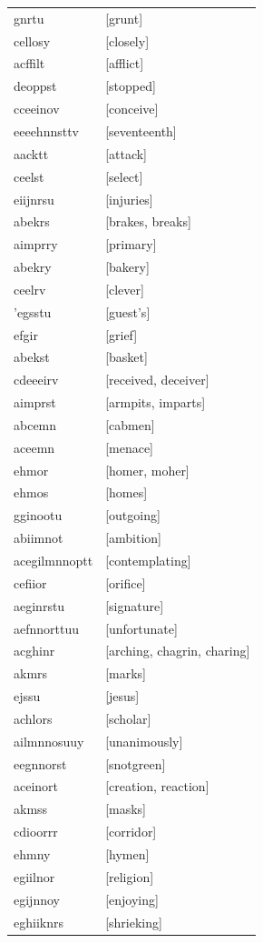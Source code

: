 \documentclass{article}
\begin{document}
\begin{tabular}{ll}
gnrtu & [grunt] \\
cellosy & [closely] \\
acffilt & [afflict] \\
deoppst & [stopped] \\
cceeinov & [conceive] \\
eeeehnnsttv & [seventeenth] \\
aacktt & [attack] \\
ceelst & [select] \\
eiijnrsu & [injuries] \\
abekrs & [brakes, breaks] \\
aimprry & [primary] \\
abekry & [bakery] \\
ceelrv & [clever] \\
'egsstu & [guest's] \\
efgir & [grief] \\
abekst & [basket] \\
cdeeeirv & [received, deceiver] \\
aimprst & [armpits, imparts] \\
abcemn & [cabmen] \\
aceemn & [menace] \\
ehmor & [homer, moher] \\
ehmos & [homes] \\
gginootu & [outgoing] \\
abiimnot & [ambition] \\
acegilmnnoptt & [contemplating] \\
cefiior & [orifice] \\
aeginrstu & [signature] \\
aefnnorttuu & [unfortunate] \\
acghinr & [arching, chagrin, charing] \\
akmrs & [marks] \\
ejssu & [jesus] \\
achlors & [scholar] \\
ailmnnosuuy & [unanimously] \\
eegnnorst & [snotgreen] \\
aceinort & [creation, reaction] \\
akmss & [masks] \\
cdioorrr & [corridor] \\
ehmny & [hymen] \\
egiilnor & [religion] \\
egijnnoy & [enjoying] \\
eghiiknrs & [shrieking] \\

\end{tabular}
\end{document}
